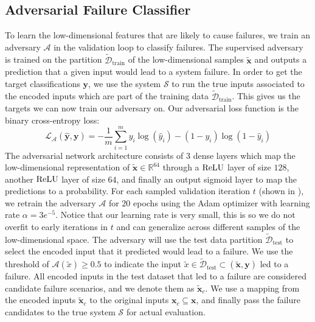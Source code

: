 \subsection{Adversarial Failure Classifier}
To learn the low-dimensional features that are likely to cause failures, we train an adversary $\mathcal{A}$ in the validation loop to classify failures.
The supervised adversary is trained on the partition $\tilde{\mathcal{D}}_\text{train}$ of the low-dimensional samples $\tilde{\mathbf{x}}$ and outputs a prediction that a given input would lead to a system failure.
In order to get the target classifications $\mathbf{y}$, we use the system $\mathcal{S}$ to run the true inputs associated to the encoded inputs which are part of the training data $\tilde{\mathcal{D}}_\text{train}$. This gives us the targets we can now train our adversary on.
Our adversarial loss function is the binary cross-entropy loss:
\[
\mathcal L_\mathcal{A}(\mathbf{\hat y}, \mathbf{y}) = -\frac{1}{m}\sum_{i=1}^m y_i\log(\hat y_i) - (1 - y_i)\log(1 - \hat y_i)
\]
The adversarial network architecture consists of $3$ dense layers which map the low-dimensional representation of $\tilde{\mathbf{x}} \in \mathbb{R}^{64}$ through a $\operatorname{ReLU}$ layer of size $128$, another $\operatorname{ReLU}$ layer of size $64$, and finally an output sigmoid layer to map the predictions to a probability.
For each sampled validation iteration $t$ (shown in ), we retrain the adversary $\mathcal{A}$ for $20$ epochs using the Adam optimizer with learning rate $\alpha=3e^{-5}$. Notice that our learning rate is very small, this is so we do not overfit to early iterations in $t$ and can generalize across different samples of the low-dimensional space. The adversary will use the test data partition $\tilde{\mathcal{D}}_\text{test}$ to select the encoded input that it predicted would lead to a failure.
We use the threshold of $\mathcal{A}(\tilde{x}) \ge 0.5$ to indicate the input $\tilde{x} \in \tilde{\mathcal{D}}_\text{test} \subset (\tilde{\mathbf{x}}, \mathbf{y})$ led to a failure.
All encoded inputs in the test dataset that led to a failure are considered candidate failure scenarios, and we denote them as $\tilde{\mathbf{x}}_c$.
We use a mapping from the encoded inputs $\tilde{\mathbf{x}}_c$ to the original inputs $\mathbf{x}_c \subseteq \mathbf{x}$, and finally pass the failure candidates to the true system $\mathcal{S}$ for actual evaluation.




